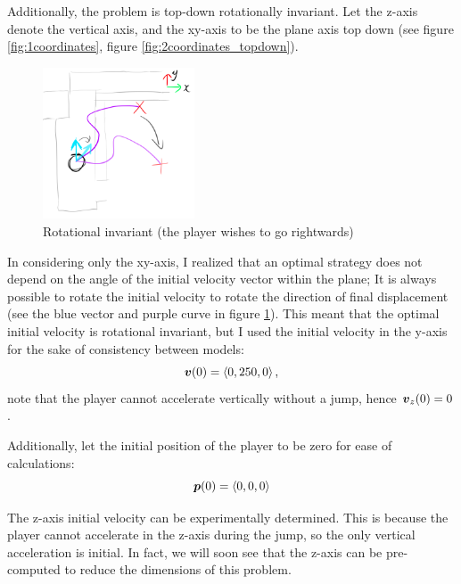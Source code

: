 Additionally, the problem is top-down rotationally invariant. Let the z-axis denote the vertical axis, and the xy-axis to be the plane axis top down (see figure \ref{fig:1coordinates}, figure \ref{fig:2coordinates_topdown}).

\begin{figure}[H]
    \centering
    \includegraphics[width=0.4\textwidth]{assets/2turning.png}
    \caption{Rotational invariant (the player wishes to go rightwards)}
    \label{fig:2turning}
\end{figure}

In considering only the xy-axis, I realized that an optimal strategy does not depend on the angle of the initial velocity vector within the plane; It is always possible to rotate the initial velocity to rotate the direction of final displacement (see the blue vector and purple curve in figure \ref{fig:2turning}). This meant that the optimal initial velocity is rotational invariant, but I used the initial velocity in the y-axis for the sake of consistency between models:
\[
    \boldsymbol{v}(0) = \left\langle 0, 250, 0 \right\rangle,
\]
note that the player cannot accelerate vertically without a jump, hence $\boldsymbol{v}_z(0) = 0$.

Additionally, let the initial position of the player to be zero for ease of calculations:
\[
    \boldsymbol{p}(0) = \left\langle 0, 0, 0 \right\rangle
\]

The z-axis initial velocity can be experimentally determined. This is because the player cannot accelerate in the z-axis during the jump, so the only vertical acceleration is initial. In fact, we will soon see that the z-axis can be pre-computed to reduce the dimensions of this problem.


